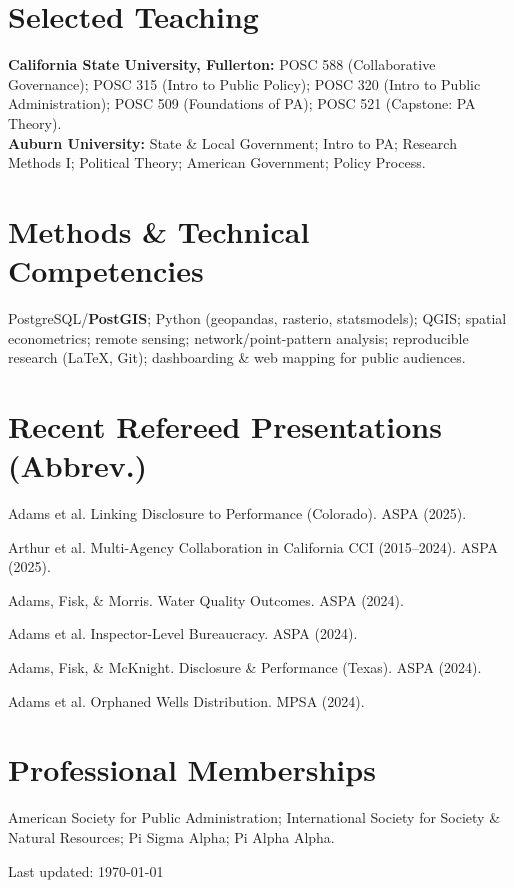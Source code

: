 \documentclass[12pt,letterpaper]{article}
\renewenvironment{itemize}{
  \begin{list}{}{
    \setlength{\leftmargin}{1.2em}
    \setlength{\itemsep}{0.15em}
    \setlength{\parskip}{0pt}
    \setlength{\parsep}{0.15em}
  }
}{
  \end{list}
}
\begin{document}
\section*{Selected Teaching}
\textbf{California State University, Fullerton:} POSC 588 (Collaborative Governance); POSC 315 (Intro to Public Policy); POSC 320 (Intro to Public Administration); POSC 509 (Foundations of PA); POSC 521 (Capstone: PA Theory).\\
\textbf{Auburn University:} State \& Local Government; Intro to PA; Research Methods I; Political Theory; American Government; Policy Process.

\section*{Methods \& Technical Competencies}
PostgreSQL/\textbf{PostGIS}; Python (geopandas, rasterio, statsmodels); QGIS; spatial econometrics; remote sensing; network/point-pattern analysis; reproducible research (LaTeX, Git); dashboarding \& web mapping for public audiences.

\section*{Recent Refereed Presentations (Abbrev.)}
\begin{itemize}
  \item Adams et al. Linking Disclosure to Performance (Colorado). ASPA (2025).
  \item Arthur et al. Multi-Agency Collaboration in California CCI (2015--2024). ASPA (2025).
  \item Adams, Fisk, \& Morris. Water Quality Outcomes. ASPA (2024).
  \item Adams et al. Inspector-Level Bureaucracy. ASPA (2024).
  \item Adams, Fisk, \& McKnight. Disclosure \& Performance (Texas). ASPA (2024).
  \item Adams et al. Orphaned Wells Distribution. MPSA (2024).
\end{itemize}

\section*{Professional Memberships}
American Society for Public Administration; International Society for Society \& Natural Resources; Pi Sigma Alpha; Pi Alpha Alpha.

\vfill
\begin{center}
\begin{small}
Last updated: \today
\end{small}
\end{center}
\end{document}
